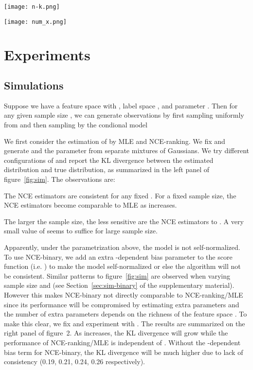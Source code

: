 \documentclass[11pt,a4paper]{article}
\begin{document}
\begin{figure*}[t!]
\begin{minipage}{0.5\textwidth}
\texttt{[image: n-k.png]}
\end{minipage}
\hspace{-1.5em}
\begin{minipage}{0.5\textwidth}
\texttt{[image: num\_x.png]}
\end{minipage}
\caption{KL divergence between the true distribution and the estimated distribution.}
\label{fig:sim}
\end{figure*}

\section{Experiments}


\subsection{Simulations}
Suppose we have a feature space  with , label space , and parameter . Then for any given sample size , we can generate observations  by first sampling  uniformly from  and then sampling  by the condional model

We first consider the estimation of  by MLE and
NCE-ranking. We fix  and generate 
and the parameter  from separate mixtures of Gaussians. We try different
configurations of  and report the KL divergence between the
estimated distribution and true distribution, as summarized in the
left panel of figure~\ref{fig:sim}. The observations are:

 The NCE estimators are consistent for any fixed . For a fixed sample size, the NCE estimators become comparable to MLE as  increases. 

 The larger the sample size, the less sensitive are the NCE estimators to . A very small value of  seems to suffice for large sample size. 


Apparently, under the parametrization above, the model is not self-normalized. To use NCE-binary, we add an extra -dependent bias parameter  to the score function (i.e. ) to make the model self-normalized or else the algorithm will not be consistent. Similar patterns to figure~\ref{fig:sim} are observed when varying sample size and  (see Section~\ref{sec:sim-binary} of the supplementary material). However this makes NCE-binary not directly comparable to NCE-ranking/MLE since its performance will be compromised by estimating extra parameters and the number of extra parameters depends on the richness of the feature space . 
 To make this clear, we fix  and experiment with . The results are summarized on the right panel of figure~2. As  increases, the KL divergence will grow while the performance of NCE-ranking/MLE is independent of . Without the -dependent bias term for NCE-binary, the KL divergence will be much higher due to lack of consistency (0.19, 0.21, 0.24, 0.26 respectively). 
\end{document}
